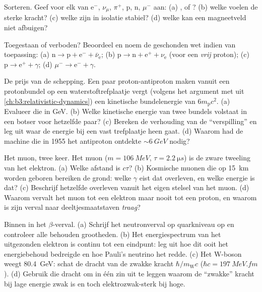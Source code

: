 \begin{exercise}[$\star$]\label{exo:b3:particle-physics:2}
Sorteren. Geef voor elk van e$^-$, $\nu_\mu$, $\pi^+$, p, n,
$\mu^-$ aan: (a) ,  of ? (b) welke voelen de sterke
kracht? (c) welke zijn in isolatie stabiel? (d) welke kan een
magneetveld niet afbuigen?
\end{exercise}

\begin{exercise}[$\star$]\label{exo:b3:particle-physics:3}
Toegestaan of verboden? Beoordeel en noem de geschonden wet indien van toepassing:
(a) $\text{n} \to \text{p} + \text{e}^- + \bar\nu_{\text{e}}$;
(b) $\text{p} \to \text{n} + \text{e}^+ + \nu_{\text{e}}$ (voor
een \emph{vrij} proton);
(c) $\text{p} \to \text{e}^+ + \gamma$;
(d) $\mu^- \to \text{e}^- + \gamma$.
\end{exercise}

\begin{exercise}[$\star$]\label{exo:b3:particle-physics:4}
De prijs van de schepping. Een paar proton-antiproton maken vanuit
een protonbundel op een waterstoftrefplaatje vergt (volgens het argument met
 uit \cref{ch:b3:relativistic-dynamics}) een
kinetische bundelenergie van $6m_{\text{p}}c^2$. (a) Evalueer die in GeV.
(b) Welke kinetische energie van twee bundels volstaat in een botser voor
hetzelfde paar? (c) Bereken de verhouding van de ``verspilling'' en leg uit waar
de energie bij een vast trefplaatje heen gaat. (d) Waarom had de machine die in 1955
het antiproton ontdekte $\sim\qty{6}{GeV}$ nodig?
\end{exercise}

\begin{exercise}[$\star\star$]\label{exo:b3:particle-physics:5}
Het muon, twee keer. Het muon ($m = \qty{106}{MeV}$,
$\tau = \qty{2.2}{\micro s}$) is de zware tweeling van het elektron. (a)
Welke afstand is $c\tau$? (b) Kosmische muonen die op
\qty{15}{km} worden geboren bereiken de grond: welke $\gamma$ eist
dat overleven, en welke energie is dat? (c) Beschrijf hetzelfde overleven
vanuit het eigen stelsel van het muon. (d) Waarom vervalt het muon tot een
elektron maar nooit tot een proton, en waarom is zijn verval naar
deeltjesmaatstaven \emph{traag}?
\end{exercise}

\begin{exercise}[$\star\star$]\label{exo:b3:particle-physics:6}
Binnen in het $\beta$-verval. (a) Schrijf het neutronverval op quarkniveau
op en controleer alle behouden grootheden. (b) Het energiespectrum van het
uitgezonden elektron is continu tot een eindpunt:
leg uit hoe dit ooit het energiebehoud bedreigde en hoe
Pauli's neutrino het redde. (c) Het W-boson weegt
\qty{80.4}{GeV}: schat de dracht van de zwakke kracht
$\hbar/m_{\text{W}}c$ ($\hbar c = \qty{197}{MeV.fm}$). (d) Gebruik
die dracht om in één zin uit te leggen waarom de ``zwakke'' kracht bij lage
energie zwak is en toch elektrozwak-sterk bij hoge.
\end{exercise}

